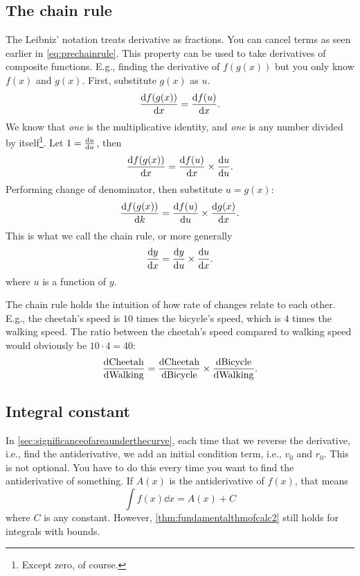 \subsection{The chain rule}
\label{sec:thechainrule}
The Leibniz' notation treats derivative as fractions. You can cancel terms as seen earlier in \cref{eq:prechainrule}. This property can be used to take derivatives of composite functions. E.g., finding the derivative of $f(g(x))$ but you only know $f(x)$ and $g(x)$. First, substitute $g(x)$ as $u$.
\begin{equation*}
    \dv{f(g(x))}{x} = \dv{f(u)}{x}.
\end{equation*}
We know that \emph{one} is the multiplicative identity, and \emph{one} is any number divided by itself\footnote{Except zero, of course.}. Let $1 = \dv{u}{u}$, then
\begin{equation*}
    \dv{f(g(x))}{x} = \dv{f(u)}{x} \times \dv{u}{u}.
\end{equation*}
Performing change of denominator, then substitute $u = g(x)$:
\begin{equation*}
    \dv{f(g(x))}{k} = \dv{f(u)}{u} \times \dv{g(x)}{x}.
\end{equation*}
This is what we call the chain rule, or more generally
\begin{equation}
    \dv{y}{x} = \dv{y}{u} \times \dv{u}{x}. \label{eq:chainrule}
\end{equation}
where $u$ is a function of $y$.

The chain rule holds the intuition of how rate of changes relate to each other. E.g., the cheetah's speed is $10$ times the bicycle's speed, which is $4$ times the walking speed. The ratio between the cheetah's speed compared to walking speed would obviously be $10\cdot 4 = 40$:
\begin{equation}
    \dv{\textrm{Cheetah}}{\textrm{Walking}} = \dv{\textrm{Cheetah}}{\textrm{Bicycle}} \times \dv{\textrm{Bicycle}}{\textrm{Walking}}.
\end{equation}

\subsection{Integral constant}
In \cref{sec:significanceofareaunderthecurve}, each time that we reverse the derivative, i.e., find the antiderivative, we add an initial condition term, i.e., $v_0$ and $r_0$. This is not optional. You have to do this every time you want to find the antiderivative of something. If $A(x)$ is the antiderivative of $f(x)$, that means
\begin{equation}
    \int f(x)\dd{x} = A(x) + C
\end{equation}
where $C$ is any constant. However, \cref{thm:fundamentalthmofcalc2} still holds for integrals with bounds.


